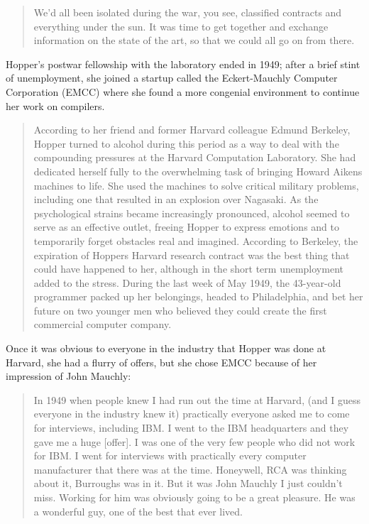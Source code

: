 \begin{quotation}
We'd all been isolated during the war, you see, classified contracts and 
everything under the sun. It was time to get together and exchange information 
on the state of the art, so that we could all go on from there.
\end{quotation}

Hopper's postwar fellowship with the laboratory ended in 1949;
after a brief stint of unemployment, she joined a startup called the Eckert-Mauchly Computer Corporation (EMCC)
where she found a more congenial environment to continue her work on compilers.

\begin{quotation}
According to her friend and former Harvard colleague Edmund Berkeley, Hopper 
turned to alcohol during this period as a way to deal with the compounding 
pressures at the Harvard Computation Laboratory. She had dedicated herself 
fully to the overwhelming task of bringing Howard Aikens machines to life.  She 
used the machines to solve critical military problems, including one that 
resulted in an explosion over Nagasaki.  As the psychological strains became 
increasingly pronounced, alcohol seemed to serve as an effective outlet, 
freeing Hopper to express emotions and to temporarily forget obstacles real and 
imagined.  According to Berkeley, the expiration of Hoppers Harvard research 
contract was the best thing that could have happened to her, although in the 
short term unemployment added to the stress.  During the last week of May 1949, 
the 43-year-old programmer packed up her belongings, headed to Philadelphia, 
and bet her future on two younger men who believed they could create the first 
commercial computer 
company.\cite{grace_hopper_and_the_invention_of_the_information_age_2009}
\end{quotation}

Once it was obvious to everyone in the industry that Hopper was done at Harvard,
she had a flurry of offers, but she chose EMCC because of her impression of John Mauchly:

\begin{quotation}
In 1949 when people knew I had run out the time at Harvard, (and I guess 
everyone in the industry knew it) practically everyone asked me to come for 
interviews, including IBM. I went to the IBM headquarters and they gave me a 
huge [offer].  I was one of the very few people who did not work for IBM. I 
went for interviews with practically every computer manufacturer that there was 
at the time. Honeywell, RCA was thinking about it, Burroughs was in it.  But it 
was John Mauchly I just couldn't miss. Working for him was obviously going to 
be a great pleasure. He was a wonderful guy, one of the best that ever lived. 
\cite{Hopper_1980_Oral_History}
\end{quotation}

